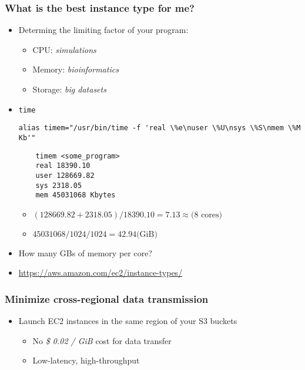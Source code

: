 \documentclass[10pt]{beamer}
\begin{document}
\begin{frame}[fragile]
    \frametitle{What is the best instance type for me?}
    \begin{itemize}
        \item Determing the limiting factor of your program:
            \begin{itemize}
                \item CPU: {\it simulations}
                \item Memory: {\it bioinformatics}
                \item Storage: {\it big datasets}
            \end{itemize}
        \item {\tt time}
            {\scriptsize
                \begin{verbatim}
alias timem="/usr/bin/time -f 'real \%e\nuser \%U\nsys \%S\nmem \%M Kb'"
                \end{verbatim}
            }

            \begin{verbatim}
    timem <some_program>
    real 18390.10
    user 128669.82
    sys 2318.05
    mem 45031068 Kbytes 
            \end{verbatim}
            \begin{itemize}
                \item $(128669.82 + 2318.05) / 18390.10 = 7.13  \approx\text{(8 cores)}$
                \item $45031068 / 1024 / 1024 = 42.94 \text{(GiB)}$
            \end{itemize}
        \pause
        \item How many GBs of memory per core?
        \item \url{https://aws.amazon.com/ec2/instance-types/}

    \end{itemize}
\end{frame}

\begin{frame}
    \frametitle{Minimize cross-regional data transmission}
    \begin{itemize}
        \item Launch EC2 instances in the same region of your S3 buckets
            \begin{itemize}
                \item No {\it \$ 0.02 / GiB} cost for data transfer
                \item Low-latency, high-throughput
            \end{itemize}
    \end{itemize}
\end{frame}
\end{document}
